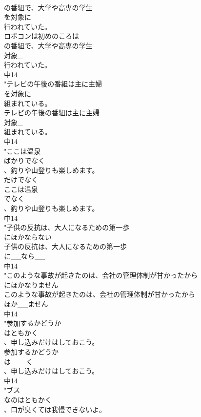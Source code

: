\documentclass[8pt]{extreport}
\begin{document}
\begin{CJK}{UTF8}{min}
\\	の番組で、大学や高専の学生
\\	を対象に
\\	行われていた。
\\	ロボコンは初めのころは
\\	の番組で、大学や高専の学生
\\	対象_
\\	行われていた。
\\	中14
\\	"テレビの午後の番組は主に主婦
\\	を対象に
\\	組まれている。
\\	テレビの午後の番組は主に主婦
\\	対象_
\\	組まれている。
\\	中14
\\	"ここは温泉
\\	ばかりでなく
\\	、釣りや山登りも楽しめます。
\\	だけでなく	
\\	ここは温泉
\\	でなく
\\	、釣りや山登りも楽しめます。
\\	中14
\\	"子供の反抗は、大人になるための第一歩
\\	にほかならない
\\	子供の反抗は、大人になるための第一歩
\\	に__なら__
\\	中14
\\	"このような事故が起きたのは、会社の管理体制が甘かったから
\\	にほかなりません
\\	このような事故が起きたのは、会社の管理体制が甘かったから
\\	ほか__ません
\\	中14
\\	"参加するかどうか
\\	はともかく
\\	、申し込みだけはしておこう。
\\	参加するかどうか
\\	は___く
\\	、申し込みだけはしておこう。
\\	中14
\\	"ブス
\\	なのはともかく
\\	、口が臭くては我慢できないよ。

\end{CJK}
\end{document}
